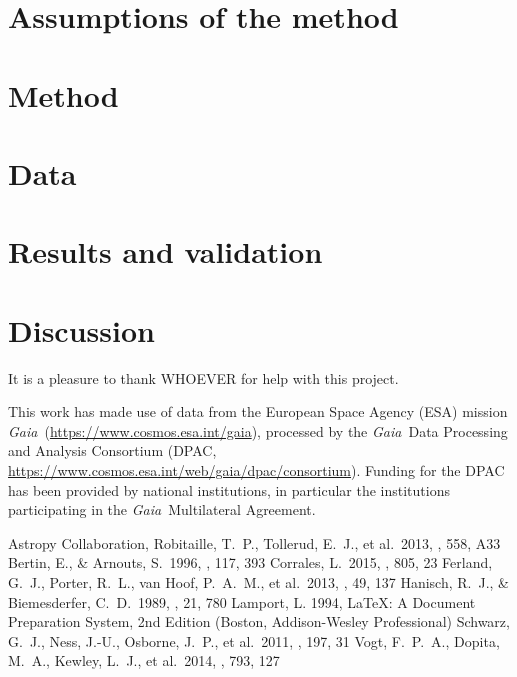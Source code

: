\documentclass[modern]{aastex62}
\newcommand{\acronym}[1]{{\small{#1}}}
\newcommand{\project}[1]{\textsl{#1}}
\newcommand{\gaia}{\project{Gaia}}
\begin{document}
\section{Assumptions of the method}

\section{Method}

\section{Data}

\section{Results and validation}

\section{Discussion}

\acknowledgements
It is a pleasure to thank
  WHOEVER
for help with this project.

This work has made use of data from the European Space Agency (ESA) mission
\gaia\ (\url{https://www.cosmos.esa.int/gaia}), processed by the \gaia\ Data
Processing and Analysis Consortium (\acronym{DPAC},
\url{https://www.cosmos.esa.int/web/gaia/dpac/consortium}). Funding for the
\acronym{DPAC}
has been provided by national institutions, in particular the institutions
participating in the \gaia\ Multilateral Agreement.

\begin{thebibliography}{}
 Astropy Collaboration, Robitaille, T.~P., Tollerud, E.~J., et al.\ 2013, \aap, 558, A33 
 Bertin, E., \& Arnouts, S.\ 1996, \aaps, 117, 393 
 Corrales, L.\ 2015, \apj, 805, 23
 Ferland, G.~J., Porter, R.~L., van Hoof, P.~A.~M., et al.\ 2013, \rmxaa, 49, 137
 Hanisch, R.~J., \& Biemesderfer, C.~D.\ 1989, \baas, 21, 780 
 Lamport, L. 1994, LaTeX: A Document Preparation System, 2nd Edition (Boston, Addison-Wesley Professional)
 Schwarz, G.~J., Ness, J.-U., Osborne, J.~P., et al.\ 2011, \apjs, 197, 31  
 Vogt, F.~P.~A., Dopita, M.~A., Kewley, L.~J., et al.\ 2014, \apj, 793, 127  
\end{thebibliography}
\end{document}
